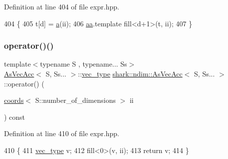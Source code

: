 Definition at line 404 of file expr.\+hpp.


\begin{DoxyCode}
404                                                                                         \{
405             t[d] = \hyperlink{classshark_1_1ndim_1_1_as_vec_acc_3_01_s_00_01_ss_8_8_8_01_4_aa23d501c29acbde8ff8d9e2c72bb4756}{a}(ii);
406             \hyperlink{classshark_1_1ndim_1_1_as_vec_acc_3_01_s_00_01_ss_8_8_8_01_4_ab43adccf8b6c612647ae7a9986dad9e2}{aa}.template fill<d+1>(t, ii);
407         \}
\end{DoxyCode}
\hypertarget{classshark_1_1ndim_1_1_as_vec_acc_3_01_s_00_01_ss_8_8_8_01_4_acd05b5d259e16e6c9f87e298547d6243}{}\label{classshark_1_1ndim_1_1_as_vec_acc_3_01_s_00_01_ss_8_8_8_01_4_acd05b5d259e16e6c9f87e298547d6243} 
\subsubsection{\texorpdfstring{operator()()}{operator()()}}
{\footnotesize\ttfamily template$<$typename S , typename... Ss$>$ \\
\hyperlink{classshark_1_1ndim_1_1_as_vec_acc}{As\+Vec\+Acc}$<$ S, Ss... $>$\+::\hyperlink{classshark_1_1ndim_1_1_as_vec_acc_3_01_s_00_01_ss_8_8_8_01_4_acc514ee9d40c54ec227d44759ce80e34}{vec\+\_\+type} \hyperlink{classshark_1_1ndim_1_1_as_vec_acc}{shark\+::ndim\+::\+As\+Vec\+Acc}$<$ S, Ss... $>$\+::operator() (\begin{DoxyParamCaption}\item[{\hyperlink{structshark_1_1ndim_1_1coords}{coords}$<$ S\+::number\+\_\+of\+\_\+dimensions $>$}]{ii }\end{DoxyParamCaption}) const\hspace{0.3cm}{\ttfamily [inline]}}



Definition at line 410 of file expr.\+hpp.


\begin{DoxyCode}
410                                                                                                            
                 \{
411             \hyperlink{classshark_1_1ndim_1_1_as_vec_acc_3_01_s_00_01_ss_8_8_8_01_4_acc514ee9d40c54ec227d44759ce80e34}{vec\_type} v;
412             fill<0>(v, ii);
413             \textcolor{keywordflow}{return} v;
414         \}
\end{DoxyCode}


